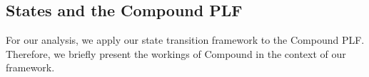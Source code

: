 








\subsection{States and the Compound PLF}
For our analysis, we apply our state transition framework to the Compound PLF.
Therefore, we briefly present the workings of Compound in the context of our framework.  

